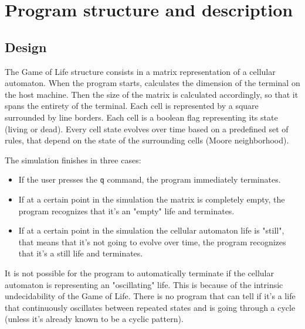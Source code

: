 \documentclass[10pt]{article}
\begin{document}
    \newpage

    \section{Program structure and description}

    \subsection{Design}
    The Game of Life structure consists in a matrix representation of a cellular automaton. When the program starts, calculates the dimension of the terminal
    on the host machine. Then the size of the matrix is calculated accordingly, so that it spans the entirety of the terminal. Each cell is represented by a square surrounded by line borders.
    Each cell is a boolean flag representing its state (living or dead). Every cell state evolves over time based on a predefined set of rules, that depend on the state of the surrounding cells (Moore neighborhood).

    The simulation finishes in three cases:
    \begin{itemize}
        \item If the user presses the \verb|q| command, the program immediately terminates.
        \item If at a certain point in the simulation the matrix is completely empty, the program recognizes that it's an "empty" life and terminates.
        \item If at a certain point in the simulation the cellular automaton life is "still", that means that it's not going to evolve over time, the program recognizes that it's a still life and terminates.
    \end{itemize}

    It is not possible for the program to automatically terminate if the cellular automaton is representing an "oscillating" life. This is because of the intrinsic undecidability of the Game of Life.
    There is no program that can tell if it's a life that continuously oscillates between repeated states and is going through a cycle (unless it's already known to be a cyclic pattern).
\end{document}
